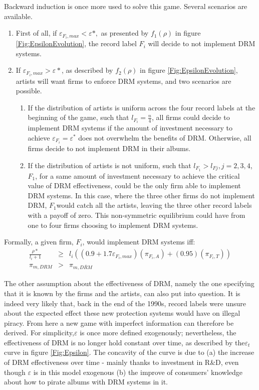 \documentclass[a4paper,12pt]{article}
\numberwithin{equation}{section}
\begin{document}
Backward induction is once more used to solve this game. Several scenarios
are available.
\begin{enumerate}
\item First of all, if $\varepsilon_{F_{i},max}<\varepsilon*,$ as presented
by $f_{1}(\rho)$ in figure \ref{Fig:EpsilonEvolution}, the record label $F_{i}$ will decide to not implement DRM systems.
\item If $\varepsilon_{F_{i},max}>\varepsilon*$, as described by $f_{2}(\rho)$
in figure \ref{Fig:EpsilonEvolution}, artists will want firms to enforce DRM systems, and two scenarios are possible.

\begin{enumerate}
\item If the distribution of artists is uniform across the four record labels
at the beginning of the game, such that $l_{F_{i}}=\frac{n}{4}$,
all firms could decide to implement DRM systems if the amount of investment
necessary to achieve $\varepsilon_{F_{i}}=\varepsilon^*$ does not overwhelm
the benefits of DRM. Otherwise, all firms decide to not implement
DRM in their albums.
\item If the distribution of artists is not uniform, such that $l_{F_{1}}>l_{Fj},$$j=2,3,4$,$F_{1}$, for a same amount of investment necessary to achieve the critical
value of DRM effectiveness, could be the only firm able to implement
DRM systems. In this case, where the three other firms do not implement
DRM, $F_{1}$would catch all the artists, leaving the three other
record labels with a payoff of zero. This non-symmetric equilibrium
could have from one to four firms choosing to implement DRM systems.
\end{enumerate}
\end{enumerate}

Formally, a given firm, $F_{i}$, would implement DRM systems iff:
\begin{eqnarray*}
\frac{\rho*}{l_{i}+1} & \geq & l_{i}((0.9+1.7\varepsilon_{F_{i},max})(\pi_{F_{i},A})+(0.95)(\pi_{F_{i},T}))\\
\pi_{m,DRM} & > & \pi_{m,\overline{DRM}}
\end{eqnarray*}

The other assumption about the effectiveness of DRM, namely the one
specifying that it is known by the firms and the artists, can also
put into question. It is indeed very likely that, back in the end
of the 1990s, record labels were unsure about the expected effect
these new protection systems would have on illegal piracy. From here
a new game with imperfect information can therefore be derived. For
simplicity,$\varepsilon$ is once more defined exogenously; nevertheless,
the effectiveness of DRM is no longer hold constant over time, as
described by the$\varepsilon_{t}$ curve in figure \ref{Fig:Epsilon}. The concavity
of the curve is due to (a) the increase of DRM effectiveness over
time - mainly thanks to investment in R\&D, even though $\varepsilon$
is in this model exogenous (b) the improve of consumers' knowledge
about how to pirate albums with DRM systems in it.\\
\end{document}

